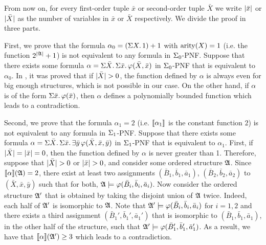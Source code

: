 
From now on, for every first-order tuple $\bar{x}$ or second-order tuple $\bar{X}$ we write $\vert \bar{x} \vert$ or $\vert \bar{X} \vert$ as the number of variables in $\bar{x}$ or $\bar{X}$ respectively. 
We divide the proof in three parts.

First, we prove that the formula $\alpha_{0} = \left( \Sigma{X}.\, 1 \right) + 1$ with ${\rm arity}(X) = 1$ (i.e. the function $2^{\vert\mathfrak{A}\vert}+1$) is not equivalent to any formula in $\Sigma_{0}$-PNF. Suppose that there exists some formula $\alpha = \Sigma{\bar{X}}.\,\Sigma{\bar{x}}.\,\varphi(\bar{X},\bar{x})$ in $\Sigma_{0}$-PNF that is equivalent to $\alpha_0$.
In \cite{SalujaST95}, it was proved that if $\vert \bar{X} \vert > 0$, the function defined by $\alpha$ is always even for big enough structures, which is not possible in our case.
On the other hand, if $\alpha$ is of the form $\Sigma{\bar{x}}.\,\varphi(\bar{x})$, then $\alpha$ defines a polynomially bounded function which leads to a contradiction.

Second, we prove that the formula $\alpha_{1} = 2$ (i.e. ${\llbracket{}{\alpha_{1}}\rrbracket}$ is the constant function $2$) is not equivalent to any formula in $\Sigma_{1}$-PNF. 
Suppose that there exists some formula $\alpha = \Sigma{\bar{X}}.\,\Sigma{\bar{x}}.\,\exists\bar{y}\, \varphi(\bar{X},\bar{x},\bar{y})$ in $\Sigma_{1}$-PNF that is equivalent to $\alpha_1$. 
First, if $\vert \bar{X} \vert = \vert \bar{x} \vert = 0$, then the function defined by $\alpha$ is never greater than 1. 
Therefore, suppose that $\vert \bar{X} \vert > 0$ or $\vert \bar{x} \vert > 0$, and consider some ordered structure $\mathfrak{A}$. 
Since ${\llbracket{}{\alpha}\rrbracket}(\mathfrak{A}) = 2$, there exist at least two assignments $(\bar{B}_1,\bar{b}_1,\bar{a}_1)$, $(\bar{B}_2,\bar{b}_2,\bar{a}_2)$ to $(\bar{X},\bar{x},\bar{y})$ such that for both, $\mathfrak{A}\models\varphi(\bar{B}_i,\bar{b}_i,\bar{a}_i)$. 
Now consider the ordered structure $\mathfrak{A}'$ that is obtained by taking the disjoint union of $\mathfrak{A}$ twice. 
Indeed, each half of $\mathfrak{A}'$ is isomorphic to $\mathfrak{A}$. 
Note that $\mathfrak{A}'\models\varphi(\bar{B}_i,\bar{b}_i,\bar{a}_i)$ for $i = 1,2$ and there exists a third assignment $(\bar{B}_1',\bar{b}_1',\bar{a}_1')$ that is isomorphic to $(\bar{B}_1,\bar{b}_1,\bar{a}_1)$, in the other half of the structure, such that $\mathfrak{A}'\models\varphi(\bar{B}_1',\bar{b}_1',\bar{a}_1')$. 
As a result, we have that ${\llbracket{}{\alpha}\rrbracket}(\mathfrak{A}') \geq 3$ which leads to a contradiction.

